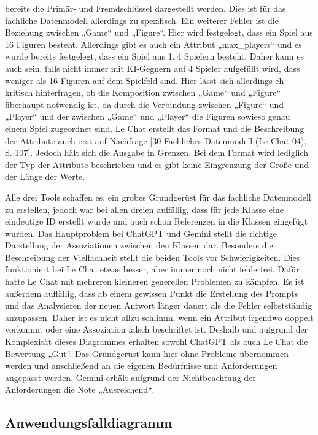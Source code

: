 bereits die Primär- und Fremdschlüssel dargestellt werden. Dies ist für das fachliche Datenmodell allerdings zu spezifisch. Ein weiterer 
Fehler ist die Beziehung zwischen „Game“ und „Figure“. Hier wird festgelegt, dass ein Spiel aus 16 Figuren besteht. Allerdings gibt es 
auch ein Attribut „max\_players“ und es wurde bereits festgelegt, dass ein Spiel aus 1..4 Spielern besteht. Daher kann es auch sein, falls 
nicht immer mit KI-Gegnern auf 4 Spieler aufgefüllt wird, dass weniger als 16 Figuren auf dem Spielfeld sind. Hier lässt sich allerdings 
eh kritisch hinterfragen, ob die Komposition zwischen „Game“ und „Figure“ überhaupt notwendig ist, da durch die Verbindung zwischen 
„Figure“ und „Player“ und der zwischen „Game“ und „Player“ die Figuren sowieso genau einem Spiel zugeordnet sind. Le Chat erstellt das 
Format und die Beschreibung der Attribute auch erst auf Nachfrage [30 Fachliches Datenmodell (Le Chat 04), S. 107]. Jedoch hält sich die 
Ausgabe in Grenzen. Bei dem Format wird lediglich der Typ der Attribute beschrieben und es gibt keine Eingrenzung der Größe und der Länge 
der Werte.

Alle drei Tools schaffen es, ein grobes Grundgerüst für das fachliche Datenmodell zu erstellen, jedoch war bei allen dreien auffällig, 
dass für jede Klasse eine eindeutige ID erstellt wurde und auch schon Referenzen in die Klassen eingefügt wurden. Das Hauptproblem bei 
ChatGPT und Gemini stellt die richtige Darstellung der Assoziationen zwischen den Klassen dar. Besonders die Beschreibung der 
Vielfachheit stellt die beiden Tools vor Schwierigkeiten. Dies funktioniert bei Le Chat etwas besser, aber immer noch nicht fehlerfrei. 
Dafür hatte Le Chat mit mehreren kleineren generellen Problemen zu kämpfen. Es ist außerdem auffällig, dass ab einem gewissen Punkt 
die Erstellung des Prompts und das Analysieren der neuen Antwort länger dauert als die Fehler selbstständig anzupassen. Daher ist es 
nicht allzu schlimm, wenn ein Attribut irgendwo doppelt vorkommt oder eine Assoziation falsch beschriftet ist. Deshalb und aufgrund 
der Komplexität dieses Diagrammes erhalten sowohl ChatGPT als auch Le Chat die Bewertung „Gut“. Das Grundgerüst kann hier ohne Probleme 
übernommen werden und anschließend an die eigenen Bedürfnisse und Anforderungen angepasst werden. Gemini erhält aufgrund der 
Nichtbeachtung der Anforderungen die Note „Ausreichend“.


\subsection*{Anwendungsfalldiagramm}

